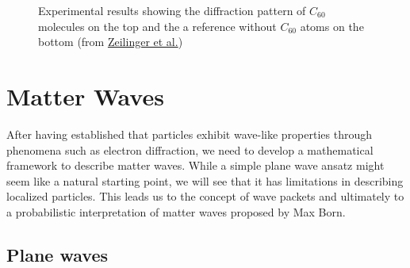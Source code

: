 \documentclass[
  a4paper,
]{book}
\begin{document}
\begin{figure}


\caption{\label{fig-zeilinger-2}Experimental results showing the
diffraction pattern of \(C_{60}\) molecules on the top and the a
reference without \(C_{60}\) atoms on the bottom (from
\href{https://www.nature.com/articles/44348}{Zeilinger et al.})}

\end{figure}%

\chapter{Matter Waves}\label{matter-waves}

After having established that particles exhibit wave-like properties
through phenomena such as electron diffraction, we need to develop a
mathematical framework to describe matter waves. While a simple plane
wave ansatz might seem like a natural starting point, we will see that
it has limitations in describing localized particles. This leads us to
the concept of wave packets and ultimately to a probabilistic
interpretation of matter waves proposed by Max Born.

\section{Plane waves}\label{plane-waves-2}
\end{document}
